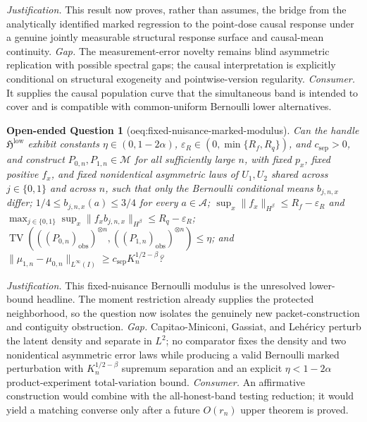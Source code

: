 \documentclass{article}
\newtheorem{openendedquestion}{Open-ended Question}
\begin{document}
\par\smallskip\noindent \textit{Justification.} This result now proves, rather than assumes, the bridge from the analytically identified marked regression to the point-dose causal response under a genuine jointly measurable structural response surface and causal-mean continuity. \textit{Gap.} The measurement-error novelty remains blind asymmetric replication with possible spectral gaps; the causal interpretation is explicitly conditional on structural exogeneity and pointwise-version regularity. \textit{Consumer.} It supplies the causal population curve that the simultaneous band is intended to cover and is compatible with common-uniform Bernoulli lower alternatives.

\begin{openendedquestion}[oeq:fixed-nuisance-marked-modulus]\label{oeq:fixed-nuisance-marked-modulus}
Can the handle \(\mathfrak H^{\mathrm{low}}\) exhibit constants \(\eta\in(0,1-2\alpha)\), \(\varepsilon_R\in(0,\min\{R_f,R_q\})\), and \(c_{\mathrm{sep}}>0\), and construct \(P_{0,n},P_{1,n}\in\mathcal M\) for all sufficiently large \(n\), with fixed \(p_x\), fixed positive \(f_x\), and fixed nonidentical asymmetric laws of \(U_1,U_2\) shared across \(j\in\{0,1\}\) and across \(n\), such that only the Bernoulli conditional means \(b_{j,n,x}\) differ; \(1/4\le b_{j,n,x}(a)\le3/4\) for every \(a\in\mathcal A\); \(\sup_x\|f_x\|_{H^{\beta}}\le R_f-\varepsilon_R\) and \(\max_{j\in\{0,1\}}\sup_x\|f_xb_{j,n,x}\|_{H^{\beta}}\le R_q-\varepsilon_R\); \(\operatorname{TV}(((P_{0,n})_{\mathrm{obs}})^{\otimes n},((P_{1,n})_{\mathrm{obs}})^{\otimes n})\le\eta\); and \(\|\mu_{1,n}-\mu_{0,n}\|_{L^{\infty}(I)}\ge c_{\mathrm{sep}}K_n^{1/2-\beta}\)?
\end{openendedquestion}
\par\smallskip\noindent \textit{Justification.} This fixed-nuisance Bernoulli modulus is the unresolved lower-bound headline. The moment restriction already supplies the protected neighborhood, so the question now isolates the genuinely new packet-construction and contiguity obstruction. \textit{Gap.} Capitao-Miniconi, Gassiat, and Lehéricy perturb the latent density and separate in \(L^2\); no comparator fixes the density and two nonidentical asymmetric error laws while producing a valid Bernoulli marked perturbation with \(K_n^{1/2-\beta}\) supremum separation and an explicit \(\eta<1-2\alpha\) product-experiment total-variation bound. \textit{Consumer.} An affirmative construction would combine with the all-honest-band testing reduction; it would yield a matching converse only after a future \(O(r_n)\) upper theorem is proved.
\end{document}
